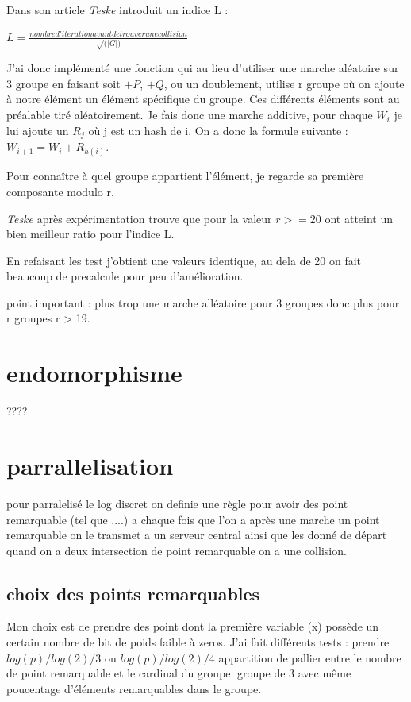 \documentclass[a4paper,10pt]{report}
\begin{document}
Dans son article \textit{Teske} introduit un indice L :
\begin{center}
 $ L = \frac{nombre d'iteration avant de trouver une collision}{\sqrt(|G|)} $
\end{center}

J'ai donc implémenté une fonction qui au lieu d'utiliser une marche aléatoire sur 3 groupe en faisant soit $+P$, $+Q$, ou un doublement,
utilise r groupe où on ajoute à notre élément un élément spécifique du groupe. Ces différents éléments sont au préalable tiré aléatoirement.
Je fais donc une marche additive, pour chaque $W_i$ je lui ajoute un $R_j$ où j est un hash de i. On a donc la formule suivante : 
$ W_{i+1} = W_{i} + R_{h(i)} $.

Pour connaître à quel groupe appartient l'élément, je regarde sa première composante modulo r.

\textit{Teske} après expérimentation trouve que pour la valeur $r >= 20$ ont atteint un bien meilleur ratio pour l'indice L.

En refaisant les test j'obtient une valeurs identique, au dela de 20 on fait beaucoup de precalcule pour peu d'amélioration.


point important : plus trop une marche alléatoire pour 3 groupes donc plus pour r groupes r > 19.

\chapter{endomorphisme}
 
 ????

\chapter{parrallelisation}

pour parralelisé le log discret on definie une règle pour avoir des point remarquable (tel que ....) 
a chaque fois que l'on a après une marche un point remarquable on le transmet a un serveur central ainsi que les donné de départ
quand on  a deux intersection de point remarquable on a une collision.

\section{choix des points remarquables}

Mon choix est de prendre des point dont la première variable (x) possède un certain nombre de bit de poids faible à zeros.
J'ai fait différents tests : prendre $log(p)/log(2)/3$ ou $log(p)/log(2)/4$ appartition de pallier entre le nombre de point remarquable et le cardinal du groupe.
groupe de 3 avec même poucentage d'éléments remarquables dans le groupe.
\end{document}
